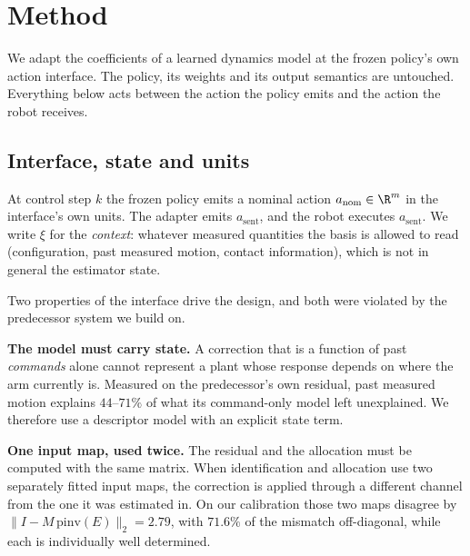 
\section{Method}\label{sec:method}

We adapt the coefficients of a learned dynamics model at the frozen policy's own
action interface. The policy, its weights and its output semantics are untouched.
Everything below acts between the action the policy emits and the action the
robot receives.

\subsection{Interface, state and units}\label{sec:method:interface}

At control step $k$ the frozen policy emits a nominal action $a_{\mathrm{nom}}\in\R^m$
in the interface's own units. The adapter emits $a_{\mathrm{sent}}$, and the robot
executes $a_{\mathrm{sent}}$. We write $\xi$ for the \emph{context}: whatever
measured quantities the basis is allowed to read (configuration, past measured
motion, contact information), which is not in general the estimator state.

Two properties of the interface drive the design, and both were violated by the
predecessor system we build on.

\textbf{The model must carry state.} A correction that is a function of past
\emph{commands} alone cannot represent a plant whose response depends on where the
arm currently is. Measured on the predecessor's own residual, past measured motion
explains $44$--$71\%$ of what its command-only model left unexplained. We therefore
use a descriptor model with an explicit state term.

\textbf{One input map, used twice.} The residual and the allocation must be
computed with the same matrix. When identification and allocation use two
separately fitted input maps, the correction is applied through a different
channel from the one it was estimated in. On our calibration those two maps
disagree by $\|I-M\,\mathrm{pinv}(E)\|_2=2.79$, with $71.6\%$ of the mismatch
off-diagonal, while each is individually well determined.

